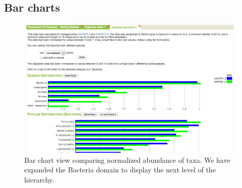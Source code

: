 \documentclass[12pt,fullpage]{report}
\begin{document}




\subsection*{Bar charts}
\label{section:bar-charts}

\begin{figure}
\begin{center}
\includegraphics[width=6in]{Images/analysis-page-bar-chart.png}
\end{center}
\caption{
Bar chart view comparing normalized abundance of taxa. We have expanded the Bacteria domain to display the next level of the hierarchy.
}
\label{fig:analysis-page-bar-chart}
\end{figure}
\end{document}
